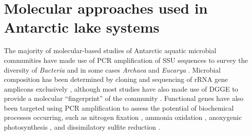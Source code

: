 

\section{Molecular approaches used in Antarctic lake systems}
\label{in:mol}
The majority of molecular-based studies of Antarctic aquatic microbial communities have made use of \ac{PCR} amplification of \ac{SSU} sequences to survey the diversity of \emph{Bacteria}
 and in some cases \emph{Archaea} and \emph{Eucarya} .
Microbial composition has been determined by cloning and sequencing of \ac{rRNA} gene amplicons exclusively 
\cite{Bowman2000a, Bowman2000b, Gordon2000, Christner2001, Purdy2003, Karr2006, Matsuzaki2006, Kurosawa2010, Bielewicz2011}, 
although most studies have also made use of \ac{DGGE} to provide a molecular ``fingerprint'' of the community 
\cite{Pearce2003a, Pearce2003b, Karr2005, Pearce2005a, Pearce2005b, Unrein2005, Glatz2006, Mikucki2007, Mosier2007, Schiaffino2009, Villaescusa2010}.
Functional genes have also been targeted using \ac{PCR} amplification to assess the potential of biochemical processes occurring, such as nitrogen fixation \cite{Olson1998}, 
ammonia oxidation \cite{Voytek1999}, anoxygenic photosynthesis \cite{Karr2003}, and dissimilatory sulfite reduction \cite{Karr2005, Mikucki2009}. %
%

